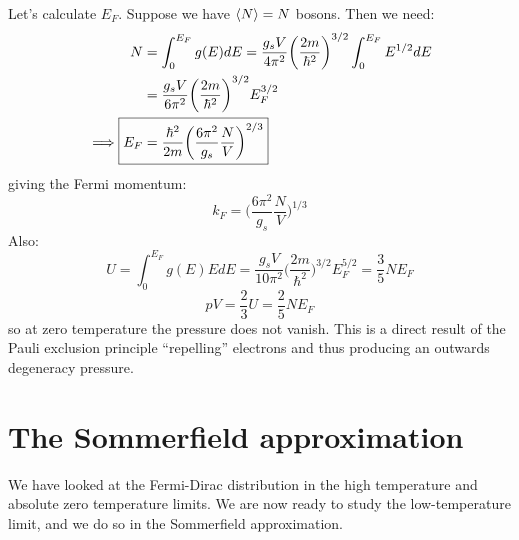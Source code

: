 \documentclass[a4paper,11pt,oneside]{book}
\begin{document}
Let's calculate $E_F$. Suppose we have $\braket{N}=N$ bosons. Then we need:
\begin{align}
    N &= \int_0^{E_F} g(E) dE = \frac{g_sV}{4\pi^2}\bigg(\frac{2m}{\hbar^2}\bigg)^{3/2}\int_0^{E_F} E^{1/2} dE\\
    &=\frac{g_sV}{6\pi^2}\bigg(\frac{2m}{\hbar^2}\bigg)^{3/2}E_F^{3/2}\\
    \implies \Aboxed{E_F &= \frac{\hbar^2}{2m}\bigg(\frac{6\pi^2 }{g_s}\frac{N}{V}\bigg)^{2/3}} \label{fermi energy}
\end{align}
giving the Fermi momentum:
\begin{equation}
    k_F = \bigg(\frac{6\pi^2 }{g_s}\frac{N}{V}\bigg)^{1/3}
\end{equation}
Also:
\begin{equation}
    U = \int_0^{E_F} g(E) E dE = \frac{g_sV}{10\pi^2}\bigg(\frac{2m}{\hbar^2}\bigg)^{3/2}E_F^{5/2} = \frac{3}{5}N E_F
\end{equation}
\begin{equation}
    pV = \frac{2}{3}U = \frac{2}{5} N E_F
\end{equation}
so at zero temperature the pressure does not vanish. This is a direct result of the Pauli exclusion principle \enquote{repelling} electrons and thus producing an outwards degeneracy pressure. 
\section{The Sommerfield approximation}
We have looked at the Fermi-Dirac distribution in the high temperature and absolute zero temperature limits. We are now ready to study the low-temperature limit, and we do so in the Sommerfield approximation. 
\end{document}
